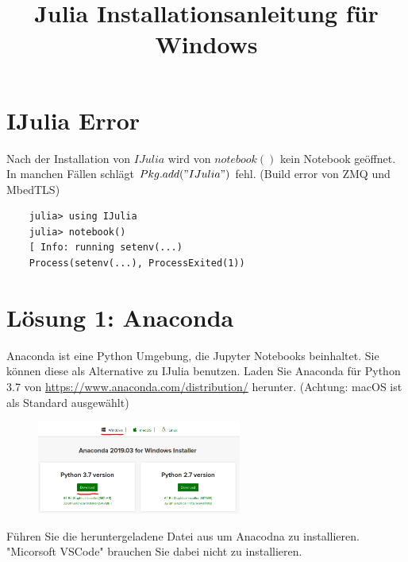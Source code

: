 \documentclass[11pt, a4paper]{scrartcl}
\title{Julia Installationsanleitung für Windows}
\author{}
\date{}
\begin{document}

\section{IJulia Error}

Nach der Installation von $IJulia$ wird von $notebook()$ kein Notebook geöffnet. In manchen Fällen schlägt $Pkg.add("IJulia")$ fehl. (Build error von ZMQ und MbedTLS)

\begin{lstlisting}
	julia> using IJulia
	julia> notebook()
	[ Info: running setenv(...)
	Process(setenv(...), ProcessExited(1))
\end{lstlisting}


\section{Lösung 1: Anaconda}

Anaconda ist eine Python Umgebung, die Jupyter Notebooks beinhaltet. Sie können diese als Alternative zu IJulia benutzen. Laden Sie Anaconda für Python 3.7 von \url{https://www.anaconda.com/distribution/} herunter. (Achtung: macOS ist als Standard ausgewählt)

\begin{figure}[h!]
	\centering
	\includegraphics[width=0.6\textwidth]{img/download.png}
\end{figure}

Führen Sie die heruntergeladene Datei aus um Anacodna zu installieren. "Micorsoft VSCode" brauchen Sie dabei nicht zu installieren.
\end{document}
